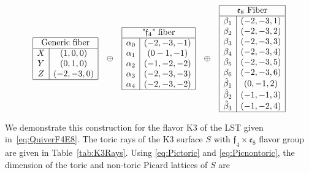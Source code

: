 \documentclass[11pt]{article}
\numberwithin{equation}{section}
\newcommand{\ff}{\mathfrak{f}}
\newcommand{\fe}{\mathfrak{e}}
\begin{document}
\begin{table}[t!]
    \centering
    \begin{align*}
    \begin{array}{ccccc}
\begin{array}{|c|c|}
\hline
\multicolumn{2}{|c|}{\text{Generic fiber}}\\ \hline
    X &  (1,0,0)\\
    Y & (0,1,0)\\
    Z &  (-2,-3,0)  \\
    \hline
\end{array}
%
&\oplus&
%
\begin{array}{|c|c|}
\hline
\multicolumn{2}{|c|}{\text{"$\ff_4$" fiber}}\\ \hline
    \alpha_0 & (-2,-3,-1)  \\
    \alpha_1 & (0-1,-1)\\
    \alpha_2 & (-1,-2,-2) \\
    \alpha_3 & (-2,-3,-3) \\
    \alpha_4 & (-2,-3,-2)\\
    \hline
\end{array}
%
&\oplus&
%
\begin{array}{|c|c|}
\hline
\multicolumn{2}{|c|}{\text{$\fe_8$ Fiber}}\\ \hline 
\beta_1 & (-2,-3,1)\\
\beta_2 & (-2,-3,2)\\
\beta_3 & (-2,-3,3)\\
\beta_4 & (-2,-3,4)\\
\beta_5 & (-2,-3,5)\\
\beta_6 &   (-2,-3,6)\\ 
\hat{\beta}_1 &
(0,-1,2)\\
\hat{\beta}_2 &
(-1,-1,3)\\
\hat{\beta}_3 &
(-1,-2,4)\\
\hline
\end{array}
\end{array}
\end{align*}
\caption{Toric rays of the K3 fiber for the quiver~\eqref{eq:QuiverF4E8}. The ``$\ff_4$'' rays $\alpha_1$ and $\alpha_2$ intersect the K3 hypersurface twice, splitting the $\ff_4$ into an $\fe_6$ fiber.}
\label{tab:K3Rays}
\end{table}
%
We demonstrate this construction for the flavor K3 of the LST given in~\eqref{eq:QuiverF4E8}. The toric rays of the K3 surface $S$ with $\ff_4 \times \fe_8$ flavor group are given in Table~\ref{tab:K3Rays}. Using \eqref{eq:Pictoric} and \eqref{eq:Picnontoric}, the dimension of the toric and non-toric Picard lattices of $S$ are
\end{document}
